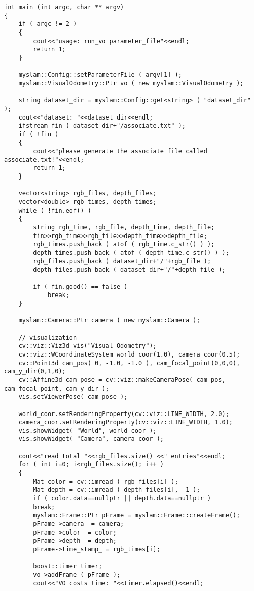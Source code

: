 \begin{lstlisting}[language = c ++, caption = slambook/project/0.2/test/run \_vo.cpp]
int main (int argc, char ** argv)
{
	if ( argc != 2 )
	{
		cout<<"usage: run_vo parameter_file"<<endl;
		return 1;
	}

	myslam::Config::setParameterFile ( argv[1] );
	myslam::VisualOdometry::Ptr vo ( new myslam::VisualOdometry );

	string dataset_dir = myslam::Config::get<string> ( "dataset_dir" );
	cout<<"dataset: "<<dataset_dir<<endl;
	ifstream fin ( dataset_dir+"/associate.txt" );
	if ( !fin )
	{
		cout<<"please generate the associate file called associate.txt!"<<endl;
		return 1;
	}

	vector<string> rgb_files, depth_files;
	vector<double> rgb_times, depth_times;
	while ( !fin.eof() )
	{
		string rgb_time, rgb_file, depth_time, depth_file;
		fin>>rgb_time>>rgb_file>>depth_time>>depth_file;
		rgb_times.push_back ( atof ( rgb_time.c_str() ) );
		depth_times.push_back ( atof ( depth_time.c_str() ) );
		rgb_files.push_back ( dataset_dir+"/"+rgb_file );
		depth_files.push_back ( dataset_dir+"/"+depth_file );
		
		if ( fin.good() == false )
			break;
	}
	
	myslam::Camera::Ptr camera ( new myslam::Camera );
	
	// visualization
	cv::viz::Viz3d vis("Visual Odometry");
	cv::viz::WCoordinateSystem world_coor(1.0), camera_coor(0.5);
	cv::Point3d cam_pos( 0, -1.0, -1.0 ), cam_focal_point(0,0,0), cam_y_dir(0,1,0);
	cv::Affine3d cam_pose = cv::viz::makeCameraPose( cam_pos, cam_focal_point, cam_y_dir );
	vis.setViewerPose( cam_pose );
	
	world_coor.setRenderingProperty(cv::viz::LINE_WIDTH, 2.0);
	camera_coor.setRenderingProperty(cv::viz::LINE_WIDTH, 1.0);
	vis.showWidget( "World", world_coor );
	vis.showWidget( "Camera", camera_coor );
	
	cout<<"read total "<<rgb_files.size() <<" entries"<<endl;
	for ( int i=0; i<rgb_files.size(); i++ )
	{
		Mat color = cv::imread ( rgb_files[i] );
		Mat depth = cv::imread ( depth_files[i], -1 );
		if ( color.data==nullptr || depth.data==nullptr )
		break;
		myslam::Frame::Ptr pFrame = myslam::Frame::createFrame();
		pFrame->camera_ = camera;
		pFrame->color_ = color;
		pFrame->depth_ = depth;
		pFrame->time_stamp_ = rgb_times[i];
		
		boost::timer timer;
		vo->addFrame ( pFrame );
		cout<<"VO costs time: "<<timer.elapsed()<<endl;
		

\end{lstlisting}
